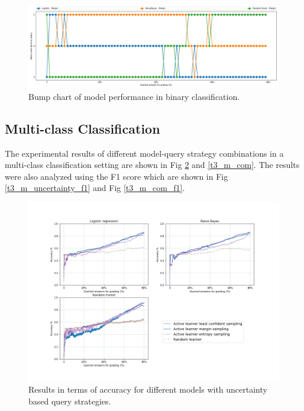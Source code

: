 \begin{figure}[!htb]
	\includegraphics[scale=0.3]{images/binary/task3_rank}
	\caption{Bump chart of model performance in binary classification.}
	\label{t3_b_bump}
\end{figure}


%	



\clearpage
\subsection{Multi-class Classification}

The experimental results of different model-query strategy combinations in a multi-class classification setting are shown in Fig \ref{t3_m_uncertainty} and \ref{t3_m_com}. The results were also analyzed using the F1 score which are shown in Fig \ref{t3_m_uncertainty_f1} and Fig \ref{t3_m_com_f1}.

\begin{figure}[!htb]
	\centering
	\includegraphics[scale=0.45]{images/task3_accuracy_uncertainty}
	\caption{Results in terms of accuracy for different models with uncertainty based query strategies.}
	\label{t3_m_uncertainty}
\end{figure}

